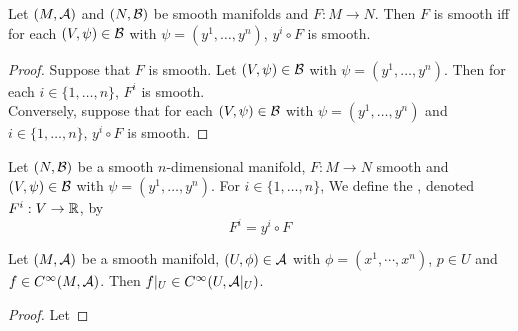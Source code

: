 \documentclass{book}
\begin{document}
\begin{ex} 
	Let $(M, \mathcal{A})$ and $(N, \mathcal{B})$ be smooth manifolds and $F: M \rightarrow N$. Then $F$ is smooth iff for each $(V, \psi) \in \mathcal{B}$ with $\psi = (y^1, \ldots, y^n)$, $y^i \circ F$ is smooth.
\end{ex}

\begin{proof}
	Suppose that $F$ is smooth. Let $(V, \psi) \in \mathcal{B}$ with $\psi = (y^1, \ldots, y^n)$. Then for each $i \in \{1, \ldots, n\}$, $F^i$ is smooth. \\
	Conversely, suppose that for each $(V, \psi) \in \mathcal{B}$ with $\psi = (y^1, \ldots, y^n)$ and $i \in \{1, \ldots, n\}$, $y^i \circ F$ is smooth. 
\end{proof}


\begin{defn} 
	Let $(N, \mathcal{B})$ be a smooth  $n$-dimensional manifold, $F: M \rightarrow N$ smooth and $(V, \psi) \in \mathcal{B}$ with $\psi = (y^1, \dots, y^n)$. For $i \in \{1, \dots, n\}$, We define the ,  denoted $F^i: V \rightarrow \mathbb{R}$, by $$F^i = y^i \circ F$$  
\end{defn}















\begin{ex}
	Let $(M, \mathcal{A})$ be a smooth manifold, $(U, \phi) \in \mathcal{A}$ with $\phi = (x^1, \cdots, x^n)$, $p \in U$ and $f \in C^{\infty}(M, \mathcal{A})$. Then $f|_U \in C^{\infty}(U, \mathcal{A}|_U)$.
\end{ex}

\begin{proof}
	Let 
\end{proof}
\end{document}
